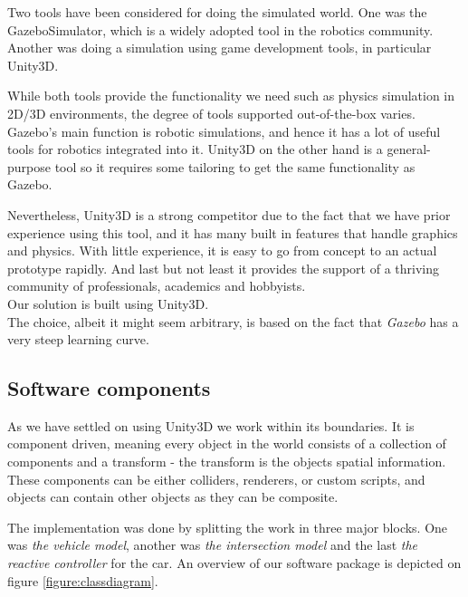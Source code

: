 Two tools have been considered for doing the simulated world. One was the GazeboSimulator, which is a widely adopted tool in the robotics community.
Another was doing a simulation using game development tools, in particular Unity3D.

While both tools provide the functionality we need such as physics simulation in 2D/3D  environments, the degree of tools supported out-of-the-box varies.
Gazebo's main function is robotic simulations, and hence it has a lot of useful tools for robotics integrated into it.
Unity3D on the other hand is a general-purpose tool so it requires some tailoring to get the same functionality as Gazebo.

Nevertheless, Unity3D is a strong competitor due to the fact that we have prior experience using this tool, and it has many built in features that handle graphics and physics. 
With little experience, it is easy to go from concept to an actual prototype rapidly.
And last but not least it provides the support of a thriving community of professionals, academics and hobbyists.\\
Our solution is built using Unity3D.\\

The choice, albeit it might seem arbitrary, is based on the fact that \textit{Gazebo} has a very steep learning curve.

\subsection{Software components}
As we have settled on using Unity3D we work within its boundaries.
It is component driven, meaning every object in the world consists of a collection of components and a transform - the transform is the objects spatial information.
These components can be either colliders, renderers, or custom scripts, and objects can contain other objects as they can be composite.

The implementation was done by splitting the work in three major blocks. One was \textit{the vehicle model}, another was \textit{the intersection model} and the last \textit{the reactive controller} for the car.
An overview of our software package is depicted on figure \ref{figure:classdiagram}.


